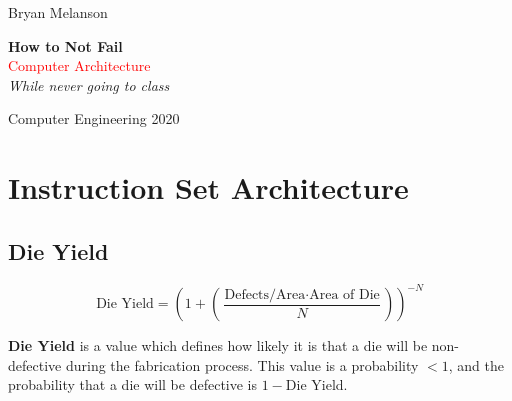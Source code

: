 \documentclass[11pt]{article}
\newcommand*{\plogo}{\fbox{$\mathcal{BM}$}}
\begin{document}
 
        
    \begin{titlepage}
    
        \raggedleft
        
        \vspace*{\baselineskip}
        
        {\Large Bryan Melanson}
        
        \vspace*{0.167\textheight}
        
        \textbf{\LARGE How to Not Fail}\\[\baselineskip]
        
        {\textcolor{Red}{\Huge Computer Architecture}}\\[\baselineskip]
        
        {\Large \textit{While never going to class}}
        
        \vfill
        
        {\large Computer Engineering 2020 ~~\plogo}
        
        \vspace*{3\baselineskip}
    
    \end{titlepage}

    \pagebreak
    
    
    \tableofcontents


\section{Instruction Set Architecture}

\subsection{Die Yield}

        
\begin{center}
    \begin{equation}
    \text{Die Yield} = (1 + (\frac{\text{Defects/Area} \cdot \text{Area of Die}}{N}))^{-N}
    \end{equation}
\end{center}

\textbf{Die Yield} is a value which defines how likely it is that a die will be non-defective during the fabrication process. This value is a probability $< 1$, and the probability that a die will be defective is $1 - $Die Yield. \\
\end{document}
